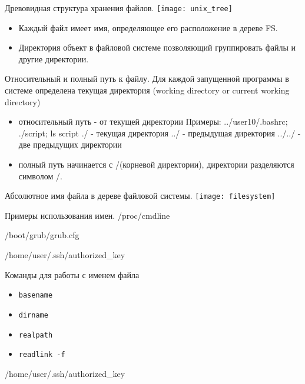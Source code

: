 
\begin{frame}{Древовидная структура хранения файлов.}
\texttt{[image: unix\_tree]} 
  \begin{itemize}
    \item Каждый файл имеет \alert{имя}, определяющее его расположение в дереве FS.
    \item \alert{Директория} объект в файловой системе позволяющий группировать файлы и другие директории.
  \end{itemize}
\end{frame}

\begin{frame}[fragile]{Относительный и полный путь к файлу.}
 Для каждой запущенной программы в системе определена \alert{текущая директория} (working directory or current working directory) 
  \begin{itemize}
    \item \alert{относительный путь} - от текущей директории \newline
      Примеры: ../user10/.bashrc; ./script; ls script
        \alert{./} - текущая директория \newline 
        \alert{../} - предыдущая директория \newline 
        \alert{../../} - две предыдущих директории 
    \item \alert{полный путь} начинается с \alert{/}(корневой директории), директории разделяются символом \alert{/}. \newline
  \end{itemize}
\end{frame}


\begin{frame}{Абсолютное имя файла в дереве файловой системы.}
\texttt{[image: filesystem]} 
\end{frame}

\begin{frame}{Примеры использования имен.}
        /proc/cmdline

        /boot/grub/grub.cfg

        /home/user/.ssh/authorized\_key \newline 
\end{frame}

\begin{frame}[fragile]{Команды для работы с именем файла}
      \begin{itemize}
		  \item {\tt basename }
		  \item {\tt dirname }
		  \item {\tt realpath} 
		  \item {\tt readlink -f }
      \end{itemize}
        /home/user/.ssh/authorized\_key
\end{frame}

